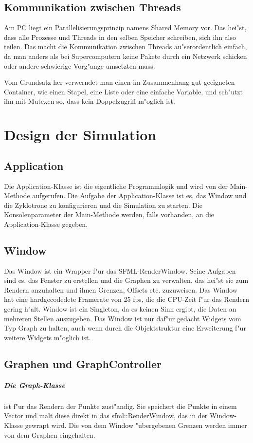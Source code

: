 \documentclass[14pt, a4paper]{report}
\begin{document}
\section{Kommunikation zwischen Threads}
Am PC liegt ein Parallelisierungsprinzip namens Shared Memory vor. Das hei"st, dass 
alle Prozesse und Threads in den selben Speicher schreiben, sich ihn also teilen. 
Das macht die Kommunikation zwischen Threads au"serordentlich einfach, da man anders als
bei Supercomputern keine Pakete durch ein Netzwerk schicken oder andere schwierige 
Vorg"ange umsetzten muss. 

Vom Grundsatz her verwerndet man einen im Zusammenhang gut geeigneten Container, wie
einen Stapel, eine Liste oder eine einfache Variable, und sch"utzt ihn mit Mutexen so, dass 
kein Doppelzugriff m"oglich ist.

\chapter{Design der Simulation}
\section{Application}
Die Application-Klasse ist die eigentliche Programmlogik und wird von der Main-Methode
aufgerufen. Die Aufgabe der Application-Klasse ist es, das Window und die Zyklotrone
zu konfigurieren und die Simulation zu starten. Die Konsolenparameter der Main-Methode
werden, falls vorhanden, an die Application-Klasse gegeben.

\section{Window} 
Das Window ist ein Wrapper f"ur das SFML-RenderWindow. Seine Aufgaben sind es, das 
Fenster zu erstellen und die Graphen zu verwalten, das hei"st sie zum Rendern 
anzuhalten und ihnen Grenzen, Offsets etc. zuzuweisen. Das Window hat eine 
hardgecodedete Framerate von 25 fps, die die CPU-Zeit f"ur das Rendern gering h"alt.
Window ist ein Singleton, da es keinen Sinn ergibt, die Daten an mehreren Stellen 
auszugeben. Das Window ist nur daf"ur gedacht Widgets vom Typ Graph zu halten,
auch wenn durch die Objektstruktur eine Erweiterung f"ur weitere Widgets m"oglich ist.

\section{Graphen und GraphController}
\paragraph{Die Graph-Klasse} ist f"ur das Rendern der Punkte zust"andig. Sie speichert
die Punkte in einem Vector und malt diese direkt in das sfml::RenderWindow, das in der
Window-Klasse gewrapt wird. Die von dem Window "ubergebenen Grenzen werden immer von dem
Graphen eingehalten.
\end{document}
